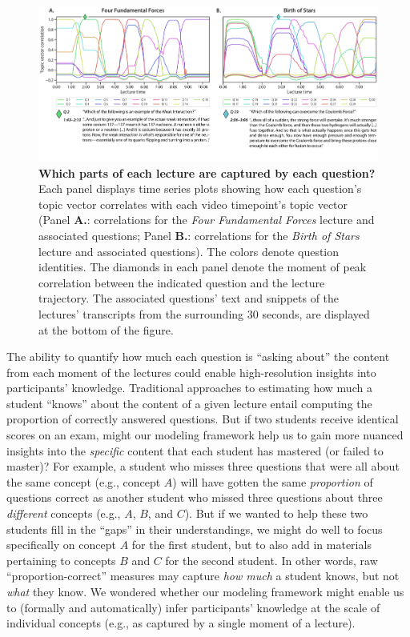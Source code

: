 \documentclass[10pt]{article}
\begin{document}
\begin{figure}[t]
    \centering
    \includegraphics[width=\textwidth]{figs/lecture-question-similarity}

    \caption{\textbf{Which parts of each lecture are captured by each
    question?} Each panel displays time series plots showing how each question's
    topic vector correlates with each video timepoint's topic vector (Panel
    \textbf{A.}: correlations for the \textit{Four Fundamental Forces} lecture
    and associated questions; Panel \textbf{B.}: correlations for the
    \textit{Birth of Stars} lecture and associated questions). The colors
    denote question identities. The diamonds in each panel denote the moment of
    peak correlation between the indicated question and the lecture trajectory.
    The associated questions' text and snippets of the lectures' transcripts
    from the surrounding 30 seconds, are displayed at the bottom of the
    figure.}

    \label{fig:question-correlations}
\end{figure}

The ability to quantify how much each question is ``asking about'' the content
from each moment of the lectures could enable high-resolution insights into
participants' knowledge. Traditional approaches to estimating how much a
student ``knows'' about the content of a given lecture entail computing the
proportion of correctly answered questions. But if two students receive
identical scores on an exam, might our modeling framework help us to gain more
nuanced insights into the \textit{specific} content that each student has
mastered (or failed to master)? For example, a student who misses three
questions that were all about the same concept (e.g., concept $A$) will have
gotten the same \textit{proportion} of questions correct as another student who
missed three questions about three \textit{different} concepts (e.g., $A$, $B$,
and $C$). But if we wanted to help these two students fill in the ``gaps'' in
their understandings, we might do well to focus specifically on concept $A$ for
the first student, but to also add in materials pertaining to concepts $B$ and
$C$ for the second student. In other words, raw ``proportion-correct'' measures
may capture \textit{how much} a student knows, but not \textit{what} they know.
We wondered whether our modeling framework might enable us to (formally and
automatically) infer participants' knowledge at the scale of individual
concepts (e.g., as captured by a single moment of a lecture).
\end{document}
